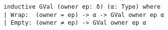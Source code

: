 \begin{lstlisting}[language=lean]
inductive GVal (owner ep: δ) (α: Type) where
| Wrap:  (owner = ep) -> α -> GVal owner ep α
| Empty: (owner ≠ ep) -> GVal owner ep α
\end{lstlisting}
